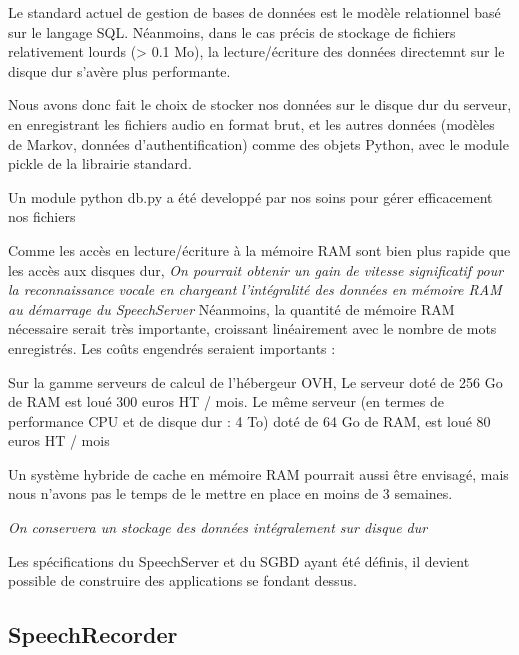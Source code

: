 \documentclass[a4paper,12pt]{report}
\begin{document}
\medskip{}

Le standard actuel de gestion de bases de données est le modèle relationnel basé sur le langage SQL. Néanmoins, dans le cas précis de stockage de fichiers relativement lourds (> 0.1 Mo), la lecture/écriture des données directemnt sur le disque dur s'avère plus performante.

\medskip{}

Nous avons donc fait le choix de stocker nos données sur le disque dur du serveur, en enregistrant les fichiers audio en format brut, et les autres données (modèles de Markov, données d'authentification) comme des objets Python, avec le module pickle de la librairie standard.

\smallskip{}

Un module python db.py a été developpé par nos soins pour gérer efficacement nos fichiers

\bigskip{}

Comme les accès en lecture/écriture à la mémoire RAM sont bien plus rapide que les accès aux disques dur,
\emph{On pourrait obtenir un gain de vitesse significatif pour la reconnaissance vocale en chargeant l'intégralité des données en mémoire RAM au démarrage du SpeechServer}
Néanmoins, la quantité de mémoire RAM nécessaire serait très importante, croissant linéairement avec le nombre de mots enregistrés. Les coûts engendrés seraient importants :

\medskip{}

Sur la gamme serveurs de calcul de l'hébergeur OVH,
Le serveur doté de 256 Go de RAM est loué 300 euros HT / mois.
Le même serveur (en termes de performance CPU et de disque dur : 4 To) doté de 64 Go de RAM, est loué 80 euros HT / mois

\medskip{}

Un système hybride de cache en mémoire RAM pourrait aussi être envisagé, mais nous n'avons pas le temps de le mettre en place en moins de 3 semaines.

\medskip{}

\emph{On conservera un stockage des données intégralement sur disque dur}

\medskip{}

Les spécifications du SpeechServer et du SGBD ayant été définis, il devient possible de construire des applications se fondant dessus.

\subsection{SpeechRecorder}
\end{document}
